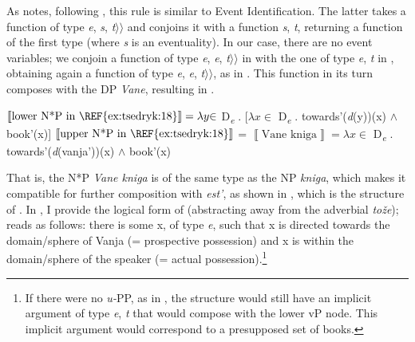 \documentclass[output=paper,colorlinks,citecolor=brown,nonflat]{./langscibook}
\begin{document}
As \citet{Myler2016} notes, following \citet{Wood2015}, this rule is similar to  Event Identification. The latter takes a function of type {\textlangle}\textit{e}, {\textlangle}\textit{s}, \textit{t}${\rangle}{\rangle}$ and conjoins it with a function {\textlangle}\textit{s}, \textit{t}{\textrangle}, returning a function of the first type (where \textit{s} is an eventuality). In our case, there are no event variables; we conjoin a function of type {\textlangle}\textit{e}, {\textlangle}\textit{e}, \textit{t}${\rangle}{\rangle}$ in  with the one of type {\textlangle}\textit{e}, \textit{t}{\textrangle} in , obtaining again a function of type {\textlangle}\textit{e}, {\textlangle}\textit{e}, \textit{t}${\rangle}{\rangle}$, as in . This function in its turn composes with the DP \textit{Vane}, resulting in .

\ea%
    \label{ex:tsedryk:25}
    \ea\label{ex:tsedryk:25a}
    $\left\llbracket \text{lower N*P in \REF{ex:tsedryk:18}}\right\rrbracket  = {\lambda}y {\in}$ D\textit{\textsubscript{e}} . [${\lambda}x {\in}$ D\textit{\textsubscript{e}} . towards'(\textit{d}(y))(x) ${\wedge}$ book'(x)]
    \ex\label{ex:tsedryk:25b}
    $\left\llbracket \text{upper N*P in \REF{ex:tsedryk:18}}\right\rrbracket $   =  $\left\llbracket \text{Vane kniga}\right\rrbracket  = {\lambda}x {\in}$ D\textit{\textsubscript{e}} . towards'(\textit{d}(vanja'))(x) ${\wedge}$ book'(x)
    \z
\z

That is, the N*P \textit{Vane kniga} is of the same type as the NP \textit{kniga}, which makes it compatible for further composition with \textit{est’}, as shown in , which is the structure of . In , I provide the logical form of  (abstracting away from the adverbial \textit{tože});  reads as follows: there is some x, of type \textit{e}, such that x is directed towards the domain/sphere of Vanja (= prospective possession) and x is within the domain/sphere of the speaker (= actual possession).\footnote{If there were no \textit{u-}PP, as in , the structure would still have an implicit argument of type \textrm{{\textlangle}}\textit{e}, \textit{t}\textrm{{\textrangle}} that would compose with the lower vP node. This implicit argument would correspond to a presupposed set of books. }   
\end{document}
